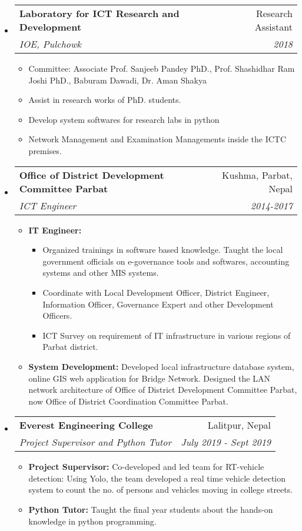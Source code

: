 \documentclass[letterpaper,11pt]{article}
\makeatletter
\newcommand{\resitem}[1]{\item #1 \vspace{-2pt}}
\newcommand{\ressubheading}[4]{
\begin{tabular*}{6.5in}{l@{\cftdotfill{\cftsecdotsep}\extracolsep{\fill}}r}
		\textbf{#1} & #2 \\
		\textit{#3} & \textit{#4} \\
\end{tabular*}\vspace{-6pt}}
\makeatother
\begin{document}
\begin{itemize}
\item[] \ressubheading{Laboratory for ICT Research and Development}{Research Assistant}{IOE, Pulchowk}{2018}
	\begin{itemize}
		\resitem{Committee: Associate Prof. Sanjeeb Pandey PhD., Prof. Shashidhar Ram Joshi PhD., Baburam Dawadi, Dr. Aman Shakya}
		\resitem{Assist in research works of PhD. students.}
		\resitem{Develop system softwares for research labs in python}
		\resitem{Network Management and Examination Managements inside the ICTC premises.}
	\end{itemize}


\item[]
	\ressubheading{Office of District Development Committee Parbat}{Kushma, Parbat, Nepal}{ICT Engineer}{2014-2017}
	\begin{itemize}
		\resitem{{\bf IT Engineer:} \begin{itemize}
			\item Organized trainings in software based knowledge. Taught the local government officials on e-governance tools and softwares, accounting systems and other MIS systems. 
			\item Coordinate with Local Development Officer, District Engineer, Information Officer, Governance Expert and other Development Officers. 
			\item ICT Survey on requirement of IT infrastructure in various regions of Parbat district.
		\end{itemize} }
    \resitem{{\bf System Development:} Developed local infrastructure database system, online GIS web application for Bridge Network. Designed the LAN network architecture of Office of District Development Committee Parbat, now Office of District Coordination Committee Parbat.}
	\end{itemize}

	

\item[]
	\ressubheading{Everest Engineering College}{Lalitpur, Nepal}{Project Supervisor and Python Tutor}{July 2019 - Sept 2019}
	\begin{itemize}
			\resitem{{\bf Project Supervisor:} Co-developed and led team for RT-vehicle detection: Using Yolo, the team developed a real time vehicle detection system to count the no. of persons and vehicles moving in college streets.}
			
            \resitem{{\bf Python Tutor:} Taught the final year students about the hands-on knowledge in python programming.}
	\end{itemize}



\end{itemize}
\end{document}
